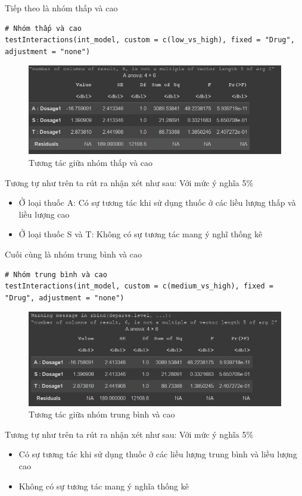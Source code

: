 \begin{itemize}
    Tiếp theo là nhóm thấp và cao
    \begin{lstlisting}
# Nhóm thấp và cao
testInteractions(int_model, custom = c(low_vs_high), fixed = "Drug", adjustment = "none")
    \end{lstlisting}
\begin{figure}[H]
    \centering
    \includegraphics[width=0.8\linewidth]{part01_figures/14.png}
    \caption{Tương tác giữa nhóm thấp và cao}
    \label{fig:Tương tác giữa nhóm thấp và cao}
\end{figure}
    Tương tự như trên ta rút ra nhận xét như sau: Với mức ý nghĩa 5\%
    \begin{itemize}
        \item Ở loại thuốc A: Có sự tương tác khi sử dụng thuốc ở các liều lượng thấp và liều lượng cao
        \item Ở loại thuốc S và T: Không có sự tương tác mang ý nghĩ thống kê
    \end{itemize}

    Cuối cùng là nhóm trung bình và cao
    \begin{lstlisting}
# Nhóm trung bình và cao
testInteractions(int_model, custom = c(medium_vs_high), fixed = "Drug", adjustment = "none")
    \end{lstlisting}
\begin{figure}[H]
    \centering
    \includegraphics[width=0.8\linewidth]{part01_figures/15.png}
    \caption{Tương tác giữa nhóm trung bình và cao}
    \label{fig:Tương tác giữa nhóm trung bình và cao}
\end{figure}
    Tương tự như trên ta rút ra nhận xét như sau: Với mức ý nghĩa 5\%
    \begin{itemize}
        \item Có sự tương tác khi sử dụng thuốc ở các  liều lượng trung bình và liều lượng cao
        \item Không có sự tương tác mang ý nghĩa thống kê
    \end{itemize}


\end{itemize}

